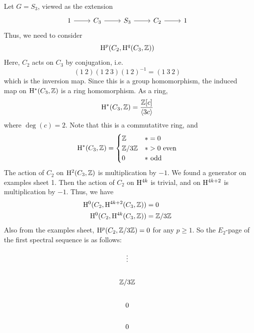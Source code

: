 \documentclass{article}
\begin{document}
\begin{example}
    Let \(G = S_3\), viewed as the extension
    \[\begin{tikzcd}
        1 & {C_3} & {S_3} & {C_2} & 1
        \arrow[from=1-1, to=1-2]
        \arrow[from=1-2, to=1-3]
        \arrow[from=1-3, to=1-4]
        \arrow[from=1-4, to=1-5]
    \end{tikzcd}\]
    Thus, we need to consider
    \[\mathrm{H}^p(C_2, \mathrm{H}^q(C_3, \mathbb{Z}))\]
    Here, \(C_2\) acts on \(C_3\) by conjugation, i.e.
    \[(1\ 2)(1\ 2\ 3)(1\ 2)^{-1} = (1\ 3\ 2)\]
    which is the inversion map. Since this is a group homomorphism, the induced map on \(\mathrm{H}^*(C_3, \mathbb{Z})\) is a ring homomorphism. As a ring,
    \[\mathrm{H}^*(C_3, \mathbb{Z}) = \frac{\mathbb{Z}[c]}{\left\langle 3c \right\rangle}\]
    where \(\deg(c) = 2\). Note that this is a commutatitve ring, and
    \begin{align*}
        \mathrm{H}^*(C_3, \mathbb{Z}) = \begin{cases}
            \mathbb{Z} & * = 0 \\
            \mathbb{Z}/3\mathbb{Z} & * > 0 \text{ even} \\
            0 & * \text{ odd}
        \end{cases}
    \end{align*}
    The action of \(C_2\) on \(\mathrm{H}^2(C_3, \mathbb{Z})\) is multiplication by \(-1\). We found a generator on examples sheet 1. Then the action of \(C_2\) on \(\mathrm{H}^{4k}\) is trivial, and on \(\mathrm{H}^{4k+2}\) is multiplication by \(-1\). Thus, we have
    \begin{align*}
        \mathrm{H}^0(C_2, \mathrm{H}^{4k+2}(C_3, \mathbb{Z})) &= 0 \\
        \mathrm{H}^0(C_2, \mathrm{H}^{4k}(C_3, \mathbb{Z})) &= \mathbb{Z}/3\mathbb{Z} \\
    \end{align*}
    Also from the examples sheet, \(\mathrm{H}^p(C_2, \mathbb{Z}/3\mathbb{Z}) = 0\) for any \(p \ge 1\). So the \(E_2\)-page of the first spectral sequence is as follows:
    \[\begin{tikzcd}
        \vdots \\
        {\Z/3\Z} \\
        0 \\
        0 \\

\end{tikzcd}\]
\end{example}
\end{document}
